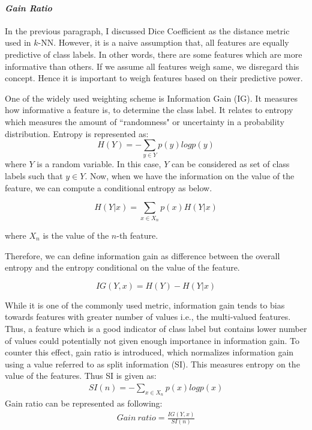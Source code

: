 \paragraph*{\textit{Gain Ratio}}

In the previous paragraph, I discussed Dice Coefficient as the distance metric used in $k$-NN. However, it is a naive assumption that, all features are equally predictive of class labels. In other words, there are some features which are more informative than others. If we assume all features weigh same, we disregard this concept. Hence it is important to weigh features based on their predictive power. 

One of the widely used weighting scheme is Information Gain (IG). It measures how informative a feature is, to determine the class label. It relates to entropy which measures the amount of ``randomness" or uncertainty in a probability distribution. Entropy is represented as:
\begin{equation}
   H(Y) = -\sum_{y \in Y}  p(y)logp(y) 
\end{equation}
where $Y$ is a random variable. In this case, $Y$ can be considered as set of class labels such that $y \in Y$. 
Now, when we have the information on the value of the feature, we can compute a conditional entropy as below. 

\begin{equation}
    H(Y|x) = \sum_{x \in X_n} p(x)H(Y|x)
\end{equation}

where $X_n$ is the value of the $n$-th feature.


Therefore, we can define information gain as difference between the overall entropy and the entropy conditional on the value of the feature. 

\begin{equation}
    IG(Y,x) = H(Y) - H(Y|x)
\end{equation}

While it is one of the commonly used metric, information gain tends to bias towards features with greater number of values i.e., the multi-valued features. Thus, a feature which is a good indicator of class label but contains lower number of values could potentially not given enough importance in information gain. To counter this effect, gain ratio is introduced, which normalizes information gain using a value referred to as split information (SI). This measures entropy on the value of the features. Thus SI is given as:
\begin{align}
    SI(n) = - \sum_{x \in X_n} p(x)logp(x)
\end{align}
Gain ratio can be represented as following:
\begin{align}
    Gain\ ratio = \frac{IG(Y,x)}{SI(n)}
\end{align}



